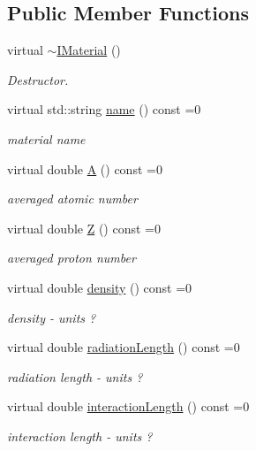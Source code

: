 \subsection*{Public Member Functions}
\begin{DoxyCompactItemize}
\item 
virtual \hyperlink{class_d_d_surfaces_1_1_i_material_ac285cbca4d2083eefe1265970e671583}{$\sim$IMaterial} ()
\begin{DoxyCompactList}\small\item\em Destructor. \item\end{DoxyCompactList}\item 
virtual std::string \hyperlink{class_d_d_surfaces_1_1_i_material_a2ae91470bda1952ae8dbcef59d655540}{name} () const =0
\begin{DoxyCompactList}\small\item\em material name \item\end{DoxyCompactList}\item 
virtual double \hyperlink{class_d_d_surfaces_1_1_i_material_a02f156030abe09aa3ebe9a4c99b059b2}{A} () const =0
\begin{DoxyCompactList}\small\item\em averaged atomic number \item\end{DoxyCompactList}\item 
virtual double \hyperlink{class_d_d_surfaces_1_1_i_material_a3e5d3e85db97ff9edb25a073109a14b0}{Z} () const =0
\begin{DoxyCompactList}\small\item\em averaged proton number \item\end{DoxyCompactList}\item 
virtual double \hyperlink{class_d_d_surfaces_1_1_i_material_ac856b9cd5ade3e0ee2720c95af766d25}{density} () const =0
\begin{DoxyCompactList}\small\item\em density -\/ units ? \item\end{DoxyCompactList}\item 
virtual double \hyperlink{class_d_d_surfaces_1_1_i_material_a30bf2290a5f4616d6f0ad5bd2e500300}{radiationLength} () const =0
\begin{DoxyCompactList}\small\item\em radiation length -\/ units ? \item\end{DoxyCompactList}\item 
virtual double \hyperlink{class_d_d_surfaces_1_1_i_material_a9217c1bc6b4c5562893c4249967cf64d}{interactionLength} () const =0
\begin{DoxyCompactList}\small\item\em interaction length -\/ units ? \item\end{DoxyCompactList}\end{DoxyCompactItemize}
